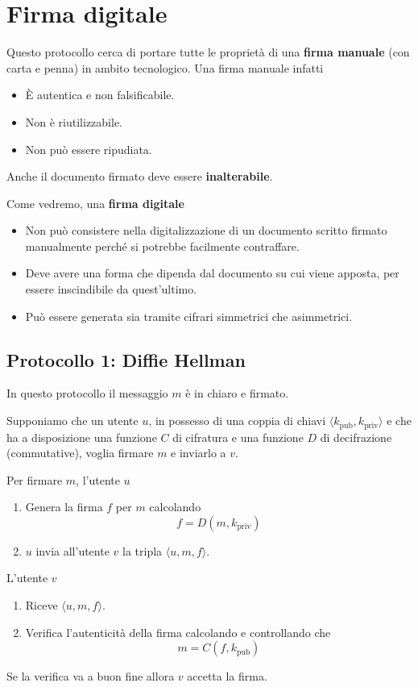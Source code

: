 \section{Firma digitale}
Questo protocollo cerca di portare tutte le propriet\`a di una \textbf{firma manuale} (con carta e penna) in ambito
tecnologico. Una firma manuale infatti
\begin{itemize}
	\item \`E autentica e non falsificabile.
	\item Non \`e riutilizzabile.
	\item Non pu\`o essere ripudiata.
\end{itemize}
Anche il documento firmato deve essere \textbf{inalterabile}.

Come vedremo, una \textbf{firma digitale}
\begin{itemize}
	\item Non pu\`o consistere nella digitalizzazione di un documento scritto firmato manualmente perch\'e si
	      potrebbe facilmente contraffare.
	\item Deve avere una forma che dipenda dal documento su cui viene apposta, per essere inscindibile da
	      quest'ultimo.
	\item Pu\`o essere generata sia tramite cifrari simmetrici che asimmetrici.
\end{itemize}

\subsection{Protocollo 1: Diffie Hellman}
In questo protocollo il messaggio $m$ \`e in chiaro e firmato.

Supponiamo che un utente $u$, in possesso di una coppia di chiavi $\langle k_\text{pub}, k_\text{priv} \rangle$ e
che ha a disposizione una funzione $C$ di cifratura e una funzione $D$ di decifrazione (commutative), voglia firmare
$m$ e inviarlo a $v$.

Per firmare $m$, l'utente $u$
\begin{enumerate}
	\item Genera la firma $f$ per $m$ calcolando
	      \[ f = D(m, k_\text{priv}) \]
	\item $u$ invia all'utente $v$ la tripla $\langle u, m, f \rangle$.
\end{enumerate}
L'utente $v$
\begin{enumerate}
	\item Riceve $\langle u, m, f \rangle$.
	\item Verifica l'autenticit\`a della firma calcolando e controllando che
	      \[ m = C(f, k_\text{pub}) \]
\end{enumerate}
Se la verifica va a buon fine allora $v$ accetta la firma.

